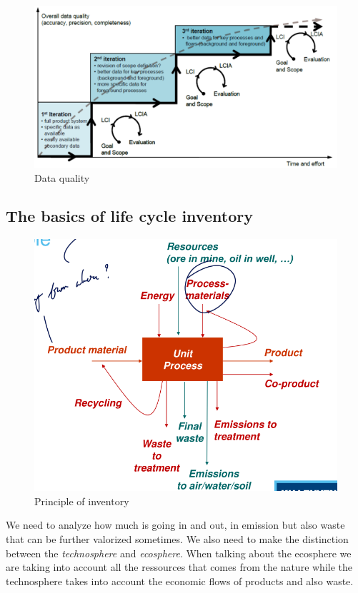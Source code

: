 \begin{figure}
\centering
\includegraphics{image.png}
\caption{Data quality}
\end{figure}

\hypertarget{the-basics-of-life-cycle-inventory}{%
\subsection{The basics of life cycle
inventory}\label{the-basics-of-life-cycle-inventory}}

\begin{figure}
\centering
\includegraphics{image-1.png}
\caption{Principle of inventory}
\end{figure}

We need to analyze how much is going in and out, in emission but also
waste that can be further valorized sometimes. We also need to make the
distinction between the \emph{technosphere} and \emph{ecosphere}. When
talking about the ecosphere we are taking into account all the
ressources that comes from the nature while the technosphere takes into
account the economic flows of products and also waste.

